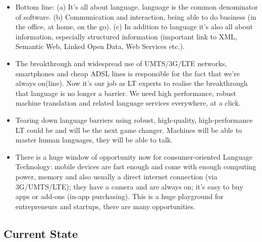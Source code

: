 \documentclass[10pt, plain]{../../metanetpaper}
\begin{document}
\begin{multicols}{2}

\begin{itemize}
\item Bottom line: (a) It’s all about language, language is the common denominator of software. (b) Communication and interaction, being able to do business (in the office, at home, on the go). (c) In addition to language it’s also all about information, especially structured information (important link to XML, Semantic Web, Linked Open Data, Web Services etc.).
\item The breakthrough and widespread use of UMTS/3G/LTE networks, smartphones and cheap ADSL lines is responsible for the fact that we’re always on(line). Now it’s our job as LT experts to realise the breakthrough that language is no longer a barrier. We need high performance, robust machine translation and related language services everywhere, at a click.
\item Tearing down language barriers using robust, high-quality, high-performance LT could be and will be the next game changer. Machines will be able to master human languages, they will be able to talk.
\item There is a huge window of opportunity now for consumer-oriented Language Technology: mobile devices are fast enough and come with enough computing power, memory and also usually a direct internet connection (via 3G/UMTS/LTE); they have a camera and are always on; it’s easy to buy apps or add-ons (in-app purchasing). This is a huge playground for entrepreneurs and startups, there are many opportunities.
\end{itemize}

\subsection{Current State}
\label{sec:current-state}


\end{multicols}
\end{document}
